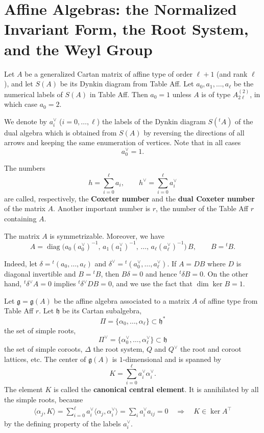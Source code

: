 \documentclass[12pt]{article}
\begin{document}
\section{Affine Algebras: the Normalized Invariant Form, the Root System, and the Weyl Group}
Let $A$ be a generalized Cartan matrix of affine type of order $\ell+1$ 
(and rank $\ell$), and let $S(A)$ be its Dynkin diagram from Table Aff. 
Let $a_0,a_1,\dots,a_\ell$ be the numerical labels of $S(A)$ in Table Aff. 
Then $a_0=1$ unless $A$ is of type $A_{2\ell}^{(2)}$, in which case $a_0=2$.

We denote by $a_i^\vee$ ($i=0,\dots,\ell$) the labels of the Dynkin diagram 
$S({}^tA)$ of the dual algebra which is obtained from $S(A)$ by reversing the 
directions of all arrows and keeping the same enumeration of vertices. 
Note that in all cases
\[
    a_0^\vee = 1.
\]

\begin{definition}
    The numbers
\[
    h = \sum_{i=0}^\ell a_i,
    \qquad
    h^\vee = \sum_{i=0}^\ell a_i^\vee
\]
are called, respectively, the \textbf{Coxeter number} and the 
\textbf{dual Coxeter number} of the matrix $A$. Another important number is $r$, the number of the Table Aff $r$ containing $A$.
\end{definition}

The matrix $A$ is symmetrizable. Moreover, we have
\begin{equation}
    A = \operatorname{diag}\!\big(a_0 (a_0^\vee)^{-1},\,
    a_1 (a_1^\vee)^{-1},\,\dots,\,
    a_\ell (a_\ell^\vee)^{-1}\big)\, B,
    \qquad B = {}^tB.
\end{equation}

Indeed, let $\delta = {}^t(a_0,\dots,a_\ell)$ and 
$\delta^\vee = {}^t(a_0^\vee,\dots,a_\ell^\vee)$. 
If $A = DB$ where $D$ is diagonal invertible and $B={}^tB$, then 
$B\delta = 0$ and hence ${}^t\delta B=0$. On the other hand, 
${}^t\delta^\vee A=0$ implies ${}^t\delta^\vee DB=0$, and we use the fact that 
$\dim\ker B = 1$.

Let $\mathfrak{g} = \mathfrak{g}(A)$ be the affine algebra associated to a 
matrix $A$ of affine type from Table Aff $r$. Let $\mathfrak{h}$ be its Cartan 
subalgebra,
\[
    \Pi = \{\alpha_0,\dots,\alpha_\ell\} \subset \mathfrak{h}^*
\]
the set of simple roots,
\[
    \Pi^\vee = \{\alpha_0^\vee,\dots,\alpha_\ell^\vee\} \subset \mathfrak{h}
\]
the set of simple coroots, $\Delta$ the root system, $Q$ and $Q^\vee$ the 
root and coroot lattices, etc. The center 
of $\mathfrak{g}(A)$ is $1$-dimensional and is spanned by
\[
    K = \sum_{i=0}^\ell a_i^\vee \alpha_i^\vee.
\]
The element $K$ is called the \textbf{canonical central element}. It is annihilated by all the simple roots, because \begin{align*}
\langle \alpha_j, K \rangle = \sum_{i=0}^\ell a_i^\vee \langle \alpha_j, \alpha_i^\vee \rangle = \sum_i a_i^\vee a_{ij} = 0
\quad \Rightarrow \quad K \in \ker A^\top
\end{align*} by the defining property of the labels $a_i^\vee$.
\end{document}

